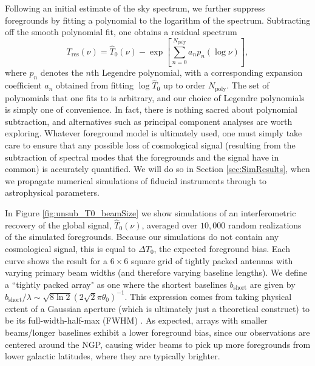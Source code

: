 \documentclass[twocolumn,apj,numberedappendix]{emulateapj}
\newcommand{\acl}[1]{}
\begin{document}
Following an initial estimate of the sky spectrum, we further suppress foregrounds by fitting a polynomial to the logarithm of the spectrum. Subtracting off the smooth polynomial fit, one obtains a residual spectrum
\begin{equation}
\label{eq:FgFit}
T_\textrm{res} (\nu) = \widehat{T}_0(\nu) -  \exp \left[ \sum_{n=0}^{N_\textrm{poly}} a_n p_n( \log \nu) \right],
\end{equation}
where $p_n$ denotes the $n$th Legendre polynomial, with a corresponding expansion coefficient $a_n$ obtained from fitting $\log \widehat{T}_0$ up to order $N_\textrm{poly}$. The set of polynomials that one fits to is arbitrary, and our choice of Legendre polynomials is simply one of convenience. In fact, there is nothing sacred about polynomial subtraction, and alternatives such as principal component analyses \citep{Liu_21cm_Fg,L13,Liu_Switzer_2014} are worth exploring. Whatever foreground model is ultimately used, one must simply take care to ensure that any possible loss of cosmological signal (resulting from the subtraction of spectral modes that the foregrounds and the signal have in common) is accurately quantified. We will do so in Section \ref{sec:SimResults}, when we propagate numerical simulations of fiducial instruments through to astrophysical parameters.

In Figure \ref{fig:unsub_T0_beamSize} we show simulations of an interferometric recovery of the global signal, $\widehat{T}_0 (\nu)$, averaged over $10,000$ random realizations of the simulated foregrounds. Because our simulations do not contain any cosmological signal, this is equal to $\Delta T_0$, the expected foreground bias. Each curve shows the result for a $6\times6$ square grid \acl{Changed array size} of tightly packed antennas with varying primary beam widths (and therefore varying baseline lengths). We define a ``tightly packed array" as one where the shortest baselines $b_\textrm{short}$ are given by $b_\textrm{short}/ \lambda \sim \sqrt{8 \ln 2} (2 \sqrt{2} \pi \theta_0)^{-1}$. This expression comes from taking physical extent of a Gaussian aperture (which is ultimately just a theoretical construct) to be its full-width-half-max (FWHM) \acl{Updated here}. As expected, arrays with smaller beams/longer baselines exhibit a lower foreground bias, since our observations are centered around the NGP, causing wider beams to pick up more foregrounds from lower galactic latitudes, where they are typically brighter.
\end{document}
